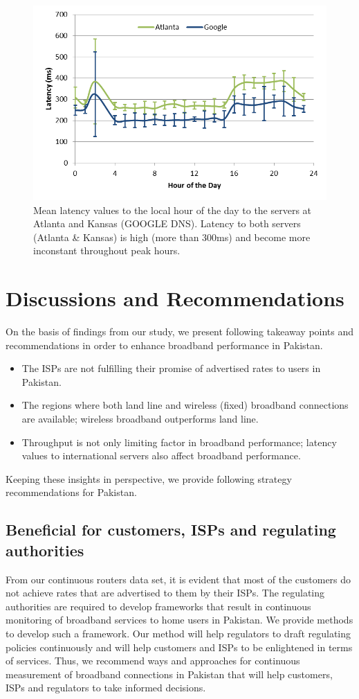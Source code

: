 \documentclass{sig-alternate-10pt}
\begin{document}
\begin{sloppypar}
\begin{figure}[t!]
\begin {center}
   \includegraphics[height=0.2 \textheight,width=0.48 \textwidth]{14.png}
   \end {center}
 \caption{Mean latency values to the local hour of the day to the servers at Atlanta and Kansas (GOOGLE DNS). Latency to both servers (Atlanta \& Kansas) is high (more than 300ms) and become more inconstant throughout peak hours.}\label{Fig:15}
\end{figure}

\section {Discussions and Recommendations}
\indent On the basis of findings from our study, we present following takeaway points and recommendations in order to enhance broadband performance in Pakistan.
\begin{itemize}
  \item The ISPs are not fulfilling their promise of advertised rates to users in Pakistan.
  \item The regions where both land line and wireless (fixed) broadband connections are available; wireless broadband outperforms land line.
  \item Throughput is not only limiting factor in broadband performance; latency values to international servers also affect broadband performance.
\end{itemize}
\indent Keeping these insights in perspective, we provide following strategy recommendations for Pakistan.\\
\subsection {Beneficial for customers, ISPs and regulating authorities}
\indent From our continuous routers data set, it is evident that most of the customers do not achieve rates that are advertised to them by their ISPs. The regulating authorities are required to develop frameworks that result in continuous monitoring of broadband services to home users in Pakistan. We provide methods to develop such a framework. Our method will help regulators to draft regulating policies continuously and will help customers and ISPs to be enlightened in terms of services. Thus, we recommend ways and approaches for continuous measurement of broadband connections in Pakistan that will help customers, ISPs and regulators to take informed decisions.

\end{sloppypar}
\end{document}
